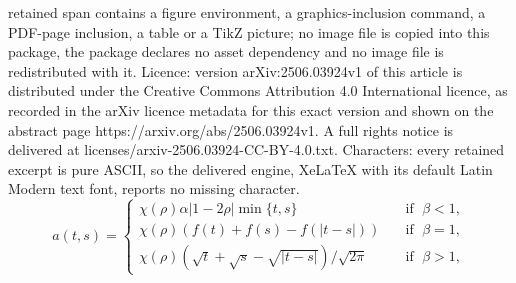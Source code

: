 \documentclass[10pt,a4paper]{amsart}
\begin{document}
retained span contains a figure environment, a graphics-inclusion command, a PDF-page inclusion, a table or a TikZ picture; no image file is copied into this package, the package declares no asset dependency and no image file is redistributed with it. Licence: version arXiv:2506.03924v1 of this article is distributed under the Creative Commons Attribution 4.0 International licence, as recorded in the arXiv licence metadata for this exact version and shown on the abstract page https://arxiv.org/abs/2506.03924v1. A full rights notice is delivered at licenses/arxiv-2506.03924-CC-BY-4.0.txt. Characters: every retained excerpt is pure ASCII, so the delivered engine, XeLaTeX with its default Latin Modern text font, reports no missing character.
\begin{equation}\label{a t s}
    a (t,s) = \begin{cases}
        \chi(\rho)\alpha|1-2\rho|\min\{t,s\} \quad &\text{if }\; \beta < 1,\\
        \chi(\rho)\left(f(t)+f(s)-f(|t-s|)\right) \quad &\text{if }\; \beta = 1,\\
        \chi(\rho)(\sqrt{t}+\sqrt{s}-\sqrt{|t-s|}) / \sqrt{2\pi}  \quad &\text{if }\; \beta > 1,
    \end{cases}
\end{equation}
\end{document}
